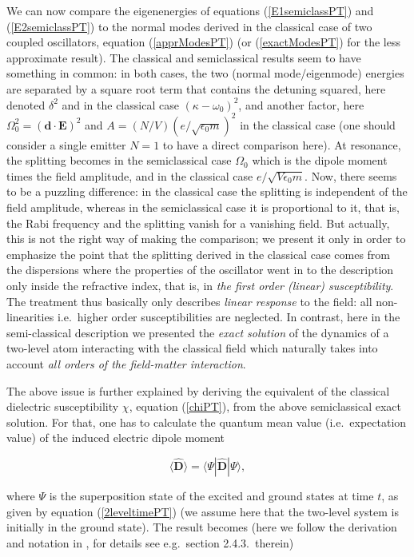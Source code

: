 \documentclass[12pt]{iopart}
\begin{document}
We can now compare the eigenenergies of equations (\ref{E1semiclassPT}) and (\ref{E2semiclassPT}) to the normal modes derived in the classical case of two coupled oscillators, equation (\ref{apprModesPT}) (or (\ref{exactModesPT}) for the less approximate result). The classical and semiclassical results seem to have something in common: in both cases, the two (normal mode/eigenmode) energies are separated by a square root term that contains the detuning squared, here denoted $\delta^2$ and in the classical case $(\kappa - \omega_0)^2$, and another factor, here $\Omega_0^2 = (\mathbf{d}\cdot\mathbf{E})^2$ and $A = (N/V) (e/\sqrt{\epsilon_0 m})^2$ in the classical case (one should consider a single emitter $N=1$ to have a direct comparison here). At resonance, the splitting becomes in the semiclassical case $\Omega_0$ which is the dipole moment times the field amplitude, and in the classical case $e/\sqrt{V\epsilon_0 m}$. Now, there seems to be a puzzling difference: in the classical case the splitting is independent of the field amplitude, whereas in the semiclassical case it is proportional to it, that is, the Rabi frequency and the splitting vanish for a vanishing field. But actually, this is not the right way of making the comparison; we present it only in order to emphasize the point that the splitting derived in the classical case comes from the dispersions where the properties of the oscillator went in to the description only inside the refractive index, that is, in {\it the first order (linear) susceptibility}. The treatment thus basically only describes {\it linear response} to the field: all non-linearities i.e.\ higher order susceptibilities are neglected. In contrast, here in the semi-classical description we presented the {\it exact solution} of the dynamics of a two-level atom interacting with the classical field which naturally takes into account {\it all orders of the field-matter interaction}.

The above issue is further explained by deriving the equivalent of the classical dielectric susceptibility $\chi$, equation (\ref{chiPT}), from the above semiclassical exact solution. For that, one has to calculate the quantum mean value (i.e.\ expectation value) of the induced electric dipole moment

\begin{equation}
\langle \hat{\mathbf{D}} \rangle = \langle \Psi |\hat{\mathbf{D}}| \Psi \rangle , 
\end{equation} 

\noindent where $\Psi$ is the superposition state of the excited and ground states at time $t$, as given by equation (\ref{2leveltimePT}) (we assume here that the two-level system is initially in the ground state). The result becomes (here we follow the derivation and notation in \cite{Grynberg10}, for details see e.g.\ section 2.4.3.\ therein)
\end{document}
